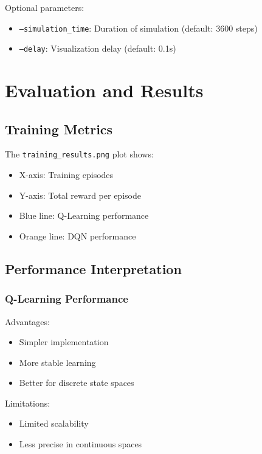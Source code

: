 \documentclass[12pt,a4paper]{article}
\begin{document}
Optional parameters:
\begin{itemize}
    \item \texttt{--simulation\_time}: Duration of simulation (default: 3600 steps)
    \item \texttt{--delay}: Visualization delay (default: 0.1s)
\end{itemize}

\section{Evaluation and Results}

\subsection{Training Metrics}
The \texttt{training\_results.png} plot shows:
\begin{itemize}
    \item X-axis: Training episodes
    \item Y-axis: Total reward per episode
    \item Blue line: Q-Learning performance
    \item Orange line: DQN performance
\end{itemize}

\subsection{Performance Interpretation}

\subsubsection{Q-Learning Performance}
\begin{tcolorbox}[title=Q-Learning Analysis]
Advantages:
\begin{itemize}
    \item Simpler implementation
    \item More stable learning
    \item Better for discrete state spaces
\end{itemize}
Limitations:
\begin{itemize}
    \item Limited scalability
    \item Less precise in continuous spaces
\end{itemize}
\end{tcolorbox}
\end{document}
